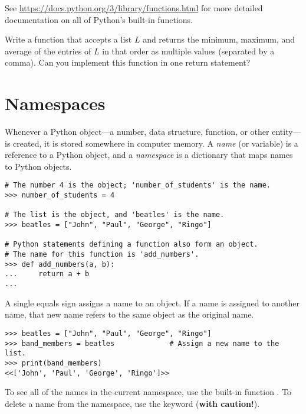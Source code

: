 See \url{https://docs.python.org/3/library/functions.html} for more detailed documentation on all of Python's built-in functions.

\begin{problem} %
Write a function that accepts a list $L$ and returns the minimum, maximum, and average of the entries of $L$ in that order as multiple values (separated by a comma).
Can you implement this function in one return statement?
\end{problem}

\section*{Namespaces} %

Whenever a Python object---a number, data structure, function, or other entity---is created, it is stored somewhere in computer memory.
A \emph{name} (or variable) is a reference to a Python object, and a \emph{namespace} is a dictionary that maps names to Python objects.

\begin{lstlisting}
# The number 4 is the object; 'number_of_students' is the name.
>>> number_of_students = 4

# The list is the object, and 'beatles' is the name.
>>> beatles = ["John", "Paul", "George", "Ringo"]

# Python statements defining a function also form an object.
# The name for this function is 'add_numbers'.
>>> def add_numbers(a, b):
...     return a + b
...
\end{lstlisting}

A single equals sign assigns a name to an object.
If a name is assigned to another name, that new name refers to the same object as the original name.

\begin{lstlisting}
>>> beatles = ["John", "Paul", "George", "Ringo"]
>>> band_members = beatles             # Assign a new name to the list.
>>> print(band_members)
<<['John', 'Paul', 'George', 'Ringo']>>
\end{lstlisting}

To see all of the names in the current namespace, use the built-in function .
To delete a name from the namespace, use the  keyword (\textbf{with caution!}).

